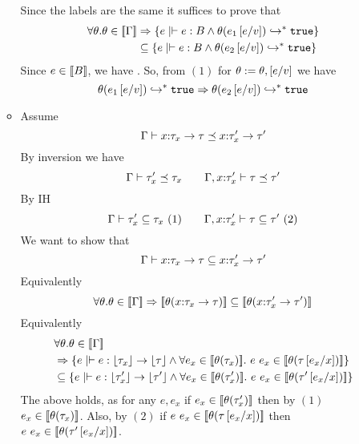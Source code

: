\begin{enumerate}
\begin{itemize}
Since the labels are the same it suffices to prove that
\begin{align*}
	\forall \theta . \iswellformedtheta{\Gamma}{\theta} & \Rightarrow 
		\{e \mid \hastype{}{e}{B} 
 			\land 
			\generalconditionInterp{e}{\thetasub{\theta}{e_1\sub{v}{e}}} 
		\}	
	\\& \subseteq 
		\{e \mid \hastype{}{e}{B} 
			\land 
			\generalconditionInterp{e}{\thetasub{\theta}{e_2\sub{v}{e}}}
		 \}	
\end{align*}
Since $e \in \interp{B}$, we have .
So, from $(1)$ for $\theta := \theta,\sub{v}{e}$
we have 
$$	
	\generalconditionImpl
		{\thetasub{\theta}{e_1\sub{v}{e}}}
		{\thetasub{\theta}{e_2\sub{v}{e}}}
$$
\item\rsubfun Assume
$$
	\issubtype{\Gamma}{\tfunref{x}{\tau_x}{\tau}{v}{e_1}}{\tfunref{x}{\tau'_x}{\tau'}{v}{e_2}}
$$
By inversion we have
$$	
	\issubtype{\Gamma}{\tau'_x}{\tau_x} \qquad
	\issubtype{\Gamma, x \colon \tau'_x}{\tau}{\tau'} 
$$
By IH
$$	
	\sissubtype{\Gamma}{\tau'_x}{\tau_x} \ (1) \qquad
	\sissubtype{\Gamma, x \colon \tau'_x}{\tau}{\tau'} \ (2)
$$
We want to show that 
$$
	\sissubtype{\Gamma}
		{\tfunref{x}{\tau_x}{\tau}{v}{e_1}}
		{\tfunref{x}{\tau'_x}{\tau'}{v}{e_2}}
$$
Equivalently
$$	
	\forall \theta . \iswellformedtheta{\Gamma}{\theta} \Rightarrow 
	\interp{\thetasub{\theta}{\tfunref{x}{\tau_x}{\tau}{v}{e_1}}} 
	\subseteq 
	\interp{\thetasub{\theta}{\tfunref{x}{\tau'_x}{\tau'}{v}{e_2}}}
$$
Equivalently
\begin{align*}
	&\forall \theta. \iswellformedtheta{\Gamma}{\theta} \\&\Rightarrow 
	\{e \mid \hastype{}{e}{\erase{\tau_x} \rightarrow \erase{\tau}} 
	\land 
	\forall e_x \in \interp{\thetasub{\theta}{\tau_x}}. \
	 \eapp{e}{e_x} \in \interp{\thetasub{\theta}{\tau\sub{x}{e_x}}} 
	 \}\\ &
	\subseteq 
	\{e \mid \hastype{}{e}{\erase{\tau'_x} \rightarrow \erase{\tau'}} 
	\land 
	\forall e_x \in \interp{\thetasub{\theta}{\tau'_x}}. \
	 \eapp{e}{e_x} \in \interp{\thetasub{\theta}{\tau'\sub{x}{e_x}}} 
	 \}
\end{align*}
The above holds, as for any $e, e_x$
if $e_x \in \interp{\thetasub{\theta}{\tau_x'}}$
then by $(1)$
$e_x \in \interp{\thetasub{\theta}{\tau_x}}$.
Also, by $(2)$
if $\eapp{e}{e_x} \in \interp{\thetasub{\theta}{\tau\sub{x}{e_x}}}$
then
$\eapp{e}{e_x} \in \interp{\thetasub{\theta}{\tau'\sub{x}{e_x}}}$.
\end{itemize}



\end{enumerate}
